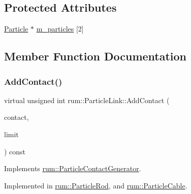 \subsection*{Protected Attributes}
\begin{DoxyCompactItemize}
\item 
\hyperlink{classrum_1_1_particle}{Particle} $\ast$ \hyperlink{classrum_1_1_particle_link_a0a919ccae0b5813620d5010d49094dc7}{m\+\_\+particles} \mbox{[}2\mbox{]}
\end{DoxyCompactItemize}


\subsection{Member Function Documentation}
\mbox{\label{classrum_1_1_particle_link_a86e7dbac23cd26fce627bf5ed1fae6f5}} 
\subsubsection{\texorpdfstring{Add\+Contact()}{AddContact()}}
{\footnotesize\ttfamily virtual unsigned int rum\+::\+Particle\+Link\+::\+Add\+Contact (\begin{DoxyParamCaption}\item[{\hyperlink{classrum_1_1_particle_contact}{Particle\+Contact} $\ast$}]{contact,  }\item[{unsigned int}]{limit }\end{DoxyParamCaption}) const\hspace{0.3cm}{\ttfamily [pure virtual]}}



Implements \hyperlink{classrum_1_1_particle_contact_generator_a99c829af7d261ff236a4d829374daa9b}{rum\+::\+Particle\+Contact\+Generator}.



Implemented in \hyperlink{classrum_1_1_particle_rod_abc0fad39193787cb65e937cd7d20874e}{rum\+::\+Particle\+Rod}, and \hyperlink{classrum_1_1_particle_cable_a06c6184b7e1d6047db4f732b132fb329}{rum\+::\+Particle\+Cable}.

\mbox{\label{classrum_1_1_particle_link_ad77a03be98566b0913aad0882e2283ac}} 
